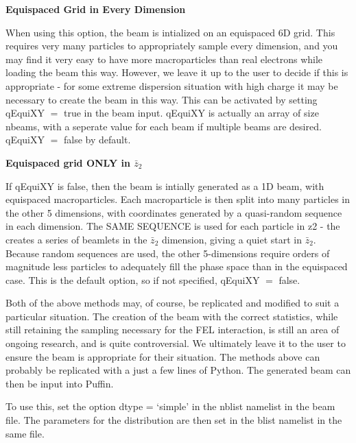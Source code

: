 \documentclass[12pt]{article}%
\begin{document}



{\bf Equispaced Grid in Every Dimension}

When using this option, the beam is intialized on an equispaced 6D grid. This requires very many particles to appropriately sample every dimension, and you may find it very easy to have more macroparticles than real electrons while loading the beam this way. However, we leave it up to the user to decide if this is appropriate - for some extreme dispersion situation with high charge it may be necessary to create the beam in this way.  This can be activated by setting qEquiXY $=$ true in the beam input. qEquiXY is actually an array of size nbeams, with a seperate value for each beam if multiple beams are desired. qEquiXY $=$ false by default.

{\bf Equispaced grid ONLY in $\bar{z}_2$}

If qEquiXY is false, then the beam is intially generated as a 1D beam, with equispaced macroparticles. Each macroparticle is then split into many particles in the other 5 dimensions, with coordinates generated by a quasi-random sequence in each dimension. The SAME SEQUENCE is used for each particle in z2 - the creates a series of beamlets in the $\bar{z}_2$ dimension, giving a quiet start in $\bar{z}_2$. Because random sequences are used, the other 5-dimensions require orders of magnitude less particles to adequately fill the phase space than in the equispaced case. This is the default option, so if not specified, qEquiXY $=$ false. 

Both of the above methods may, of course, be replicated and modified to suit a particular situation. The creation of the beam with the correct statistics, while still retaining the sampling necessary for the FEL interaction, is still an area of ongoing research, and is quite controversial. We ultimately leave it to the user to ensure the beam is appropriate for their situation. The methods above can probably be replicated with a just a few lines of Python. The generated beam can then be input into Puffin.

To use this, set the option dtype = `simple' in the nblist namelist in the beam file. The parameters for the distribution are then set in the blist namelist in the same file.
\end{document}
